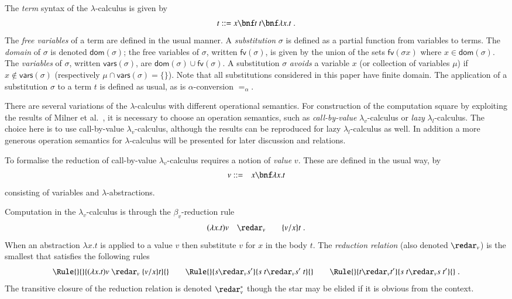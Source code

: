 \documentclass{llncs}
\renewcommand{\rew}{\redar}
\begin{document}
The {\em term} syntax of the $\lambda$-calculus is given by
\[
t ::= x \bnf t~t \bnf \lambda x.t \; .
\]
The {\em free variables} of a term are defined in the usual manner.
A {\em substitution} $\sigma$ is defined as a partial function from variables to terms.
The {\em domain} of $\sigma$ is denoted $\textsf{dom}(\sigma)$;
the free variables of $\sigma$, written $\textsf{fv}(\sigma)$, is given by the union of the sets $\textsf{fv}(\sigma x)$ where $x \in \textsf{dom}(\sigma)$.
The {\em variables} of $\sigma$, written $\textsf{vars}(\sigma)$, are $\textsf{dom}(\sigma)\cup\textsf{fv}(\sigma)$.
A substitution $\sigma$ {\em avoids} a variable $x$ (or collection of variables $\mu$) if $x\notin\textsf{vars}(\sigma)$ (respectively $\mu\cap\textsf{vars}(\sigma)=\{\}$).
Note that all substitutions considered in this paper have finite domain.
The application of a substitution $\sigma$ to a term $t$ is defined as usual, as is $\alpha$-conversion $=_\alpha$.

There are several variations of the $\lambda$-calculus with different operational semantics.
For construction of the computation square by exploiting the results of Milner et al.~\cite{90426}, it is necessary to choose an operation semantics, such as {\em call-by-value} $\lambda_v$-calculus or {\em lazy} $\lambda_l$-calculus.
The choice here is to use call-by-value $\lambda_v$-calculus, although the results can be reproduced for lazy $\lambda_l$-calculus as well.
In addition a more generous operation semantics for $\lambda$-calculus will be presented for later discussion and relations.

To formalise the reduction of call-by-value $\lambda_v$-calculus requires a notion of {\em value} $v$. These are defined in the usual way, by
\begin{eqnarray*}
v &::=& x \bnf \lambda x.t
\end{eqnarray*}
consisting of variables and $\lambda$-abstractions.

Computation in the $\lambda_v$-calculus is through the $\beta_v$-reduction rule
\begin{eqnarray*}
(\lambda x.t)v &\quad\rew_v\quad& \{v/x\}t \; .
\end{eqnarray*}
When an abstraction $\lambda x.t$ is applied to a value $v$ then substitute $v$ for $x$ in the body $t$.
The {\em reduction relation} (also denoted $\rew_v$) is the smallest that satisfies the following rules
\begin{equation*}
\Rule{}{}{(\lambda x.t)v \ \rew_v\  \{v/x\}t}{}
\qquad
\Rule{}{s\rew_v s'}{s~t\rew_v s'~t}{}
\qquad
\Rule{}{t\rew_v t'}{s~t\rew_v s~t'}{} \; .
\end{equation*}
The transitive closure of the reduction relation is denoted $\rew_v^*$ though the star may be elided if it is obvious from the context.
\end{document}

